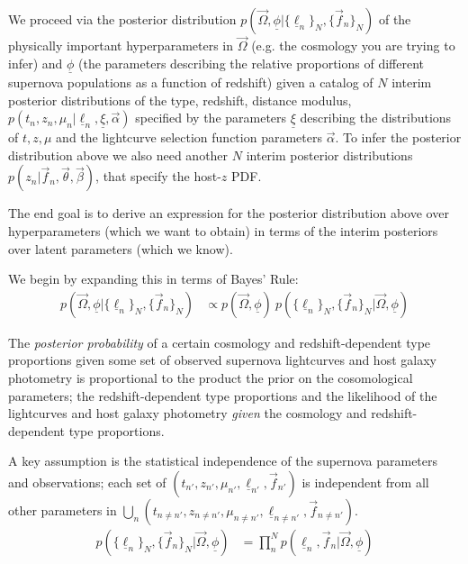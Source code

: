 \documentclass[12pt, twocolumn]{emulateapj}
\newcommand{\textul}{\underline}
\begin{document}
We proceed via the posterior distribution $p(\vec{\Omega}, \textul{\phi} | \{\textul{\ell}_{n}\}_{N}, \{\vec{f}_{n}\}_{N})$ of the physically important hyperparameters in $\vec{\Omega}$ (e.g. the cosmology you are trying to infer) and $\textul{\phi}$ (the parameters describing the relative proportions of different supernova populations as a function of redshift) given a catalog of $N$ interim posterior distributions of the type, redshift, distance modulus, $p(t_{n}, z_{n}, \mu_{n} | \textul{\ell}_{n}, \textul{\xi}, \vec{\alpha})$ specified by the parameters $\textul{\xi}$ describing the distributions of $t,z,\mu$ and the lightcurve selection function parameters $\vec{\alpha}$.
To infer the posterior distribution above we also need another $N$ interim posterior distributions $p(z_{n} | \vec{f}_{n}, \vec{\theta}, \vec{\beta})$, that specify the host-$z$ PDF.


The end goal is to derive an expression for the posterior distribution above over hyperparameters (which we want to obtain) in terms of the interim posteriors over latent parameters (which we know).

We begin by expanding this in terms of Bayes' Rule:
\begin{align}
\label{eq:bayes}
p(\vec{\Omega}, \textul{\phi} | \{\textul{\ell}_{n}\}_{N}, \{\vec{f}_{n}\}_{N}) &\propto p(\vec{\Omega}, \textul{\phi})\ p(\{\textul{\ell}_{n}\}_{N}, \{\vec{f}_{n}\}_{N} | \vec{\Omega}, \textul{\phi})
\end{align}

The \textit{posterior probability} of a certain cosmology and redshift-dependent type proportions given some set of observed supernova lightcurves and host galaxy photometry is proportional to the product the prior on the cosomological parameters; 
the redshift-dependent type proportions and the likelihood of the lightcurves and host galaxy photometry \textit{given} the cosmology and redshift-dependent type proportions.

A key assumption is the statistical independence of the supernova parameters and observations; 
each set of $(t_{n'}, z_{n'}, \mu_{n'}, \textul{\ell}_{n'}, \vec{f}_{n'})$ is independent from all other parameters in $\bigcup_{n}(t_{n\neq n'}, z_{n\neq n'}, \mu_{n\neq n'}, \textul{\ell}_{n\neq n'}, \vec{f}_{n\neq n'})$.
\begin{align}
\label{eq:independence}
p(\{\textul{\ell}_{n}\}_{N}, \{\vec{f}_{n}\}_{N} | \vec{\Omega}, \textul{\phi}) &= \prod_{n}^{N}p(\textul{\ell}_{n}, \vec{f}_{n} | \vec{\Omega}, \textul{\phi})
\end{align}
\end{document}
